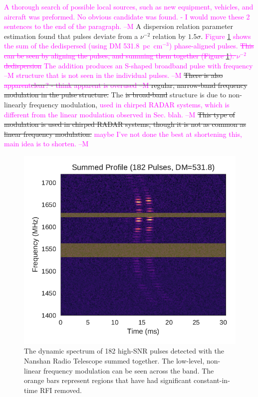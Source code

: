 \documentclass[a4paper,fleqn,usenatbib]{mnras}
\newcommand{\cM}[1]{\textcolor{magenta}{ #1 --M}}
\begin{document}
\cM{A thorough search of possible local sources, such as new equipment, vehicles,
and aircraft was preformed. No obvious candidate was found. - I would move these 2 sentences to the end of the paragraph.} A dispersion
relation parameter estimation found that pulses deviate from a $\nu^{-2}$
relation by $1.5 \sigma$. \cM{Figure \ref{fig:xao_summed} shows the sum of the dedispersed (using DM
531.8~pc~cm$^{-3}$) phase-aligned pulses.  \sout{This can be seen by aligning the pulses, and summing
them together (Figure \ref{fig:xao_summed}). $\nu^{-2}$ dedispersion} The addition produces an S-shaped broadband pulse with \cM{frequency} structure that is not
seen in the individual pulses.} \sout{There is also \cM{\sout{apparent}clear? - think apparent is overused} regular, narrow-band
frequency modulation in the pulse structure.} The \sout{is broad-band} structure is due to
non-linearly frequency modulation, \cM{used in chirped RADAR systems, which is different from the linear modulation observed in Sec. blah.}
\sout{This type of modulation is used in chirped
RADAR systems, though it is not as common as linear frequency modulation.} \cM{maybe I've not done the best at shortening this, main idea is to shorten.}

\begin{figure}
    \includegraphics[width=1.0\linewidth]{figures/XAO_summed_dynamic.pdf}
    \caption{The dynamic spectrum of 182 high-SNR pulses detected with the
    Nanshan Radio Telescope summed together.  The low-level, non-linear
    frequency modulation can be seen across the band. The orange bars represent
    regions that have had significant constant-in-time RFI removed.
    }
    \label{fig:xao_summed}
\end{figure}
\end{document}
